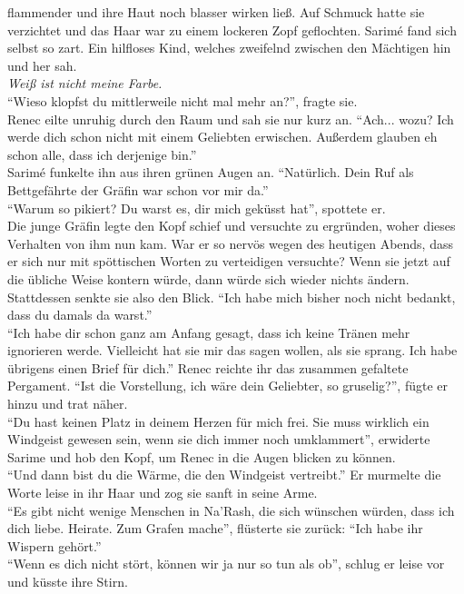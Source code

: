 flammender und ihre Haut noch blasser wirken ließ. Auf Schmuck hatte sie verzichtet und das Haar 
war zu einem lockeren Zopf geflochten. Sarimé fand sich selbst so zart. Ein hilfloses Kind, welches 
zweifelnd zwischen den Mächtigen hin und her sah.\\
\textit{Weiß ist nicht meine Farbe.}\\
``Wieso klopfst du mittlerweile nicht mal mehr an?'', fragte sie.\\
Renec eilte unruhig durch den Raum und sah sie nur kurz an. ``Ach... wozu? Ich werde dich schon 
nicht mit einem Geliebten erwischen. Außerdem glauben eh schon alle, dass ich derjenige bin.''\\
Sarimé funkelte ihn aus ihren grünen Augen an. ``Natürlich. Dein Ruf als Bettgefährte der Gräfin 
war schon vor mir da.''\\
``Warum so pikiert? Du warst es, dir mich geküsst hat'', spottete er.\\
Die junge Gräfin legte den Kopf schief und versuchte zu ergründen, woher dieses Verhalten von ihm 
nun kam. War er so nervös wegen des heutigen Abends, dass er sich nur mit spöttischen Worten zu 
verteidigen versuchte? Wenn sie jetzt auf die übliche Weise kontern würde, dann würde sich wieder 
nichts ändern. Stattdessen senkte sie also den Blick. ``Ich habe mich bisher noch nicht bedankt, 
dass du damals da warst.''\\
``Ich habe dir schon ganz am Anfang gesagt, dass ich keine Tränen mehr ignorieren werde. Vielleicht 
hat sie mir das sagen wollen, als sie sprang. Ich habe übrigens einen Brief für dich.'' Renec 
reichte ihr das zusammen gefaltete Pergament. ``Ist die Vorstellung, ich wäre dein Geliebter, so 
gruselig?'', fügte er hinzu und trat näher.\\
``Du hast keinen Platz in deinem Herzen für mich frei. Sie muss wirklich ein Windgeist gewesen 
sein, wenn sie dich immer noch umklammert'', erwiderte Sarime und hob den Kopf, um Renec in die 
Augen blicken zu können.\\
``Und dann bist du die Wärme, die den Windgeist vertreibt.'' Er murmelte die Worte leise in ihr 
Haar und zog sie sanft in seine Arme.\\
``Es gibt nicht wenige Menschen in Na'Rash, die sich wünschen würden, dass ich dich liebe. Heirate. 
Zum Grafen mache'', flüsterte sie zurück: ``Ich habe ihr Wispern gehört.''\\
``Wenn es dich nicht stört, können wir ja nur so tun als ob'', schlug er leise vor und küsste ihre 
Stirn.\\
